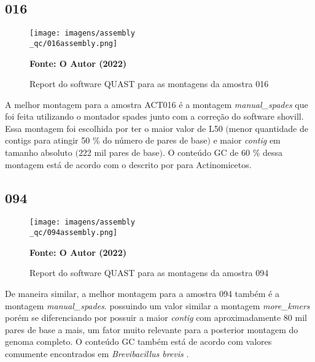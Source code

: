 \subsection{016}
\begin{figure}[H]
	\caption{Report do software QUAST para as montagens da amostra 016}
	\label{fig:quast_16}
	\centering
		\texttt{[image: imagens/assembly\\\_qc/016assembly.png]} \\
	\centering
    \begin{small}\textbf{Fonte: O Autor (2022)}\end{small}
\end{figure}
\vspace{\floatsep}

A melhor montagem para a amostra ACT016 é a montagem \textit{manual\_spades} que foi feita utilizando
o montador spades junto com a correção do software shovill. Essa montagem foi escolhida por ter o maior
valor de L50 $($menor quantidade de contigs para atingir 50 \% do número de pares de base$)$ e maior 
\textit{contig} em tamanho absoluto $($222 mil pares de base$)$. O conteúdo GC de 60 \% dessa montagem está de acordo
com o descrito por  para Actinomicetos.

\subsection{094}

\begin{figure}[H]
	\caption{Report do software QUAST para as montagens da amostra 094}
	\label{fig:quast_16}
	\centering
		\texttt{[image: imagens/assembly\\\_qc/094assembly.png]} \\
	\centering
    \begin{small}\textbf{Fonte: O Autor (2022)}\end{small}
\end{figure}
\vspace{\floatsep}

De maneira similar, a melhor montagem para a amostra 094 também é a montagem \textit{manual\_spades}.
possuindo um valor similar a montagem \textit{more\_kmers} porém se diferenciando por possuir a maior \textit{contig}
com aproximadamente 80 mil pares de base a mais, um fator muito relevante para a posterior montagem do genoma completo.
O conteúdo GC também está de acordo com valores comumente encontrados em \textit{Brevibacillus brevis} \cite{nakamura1991bacillus}.

